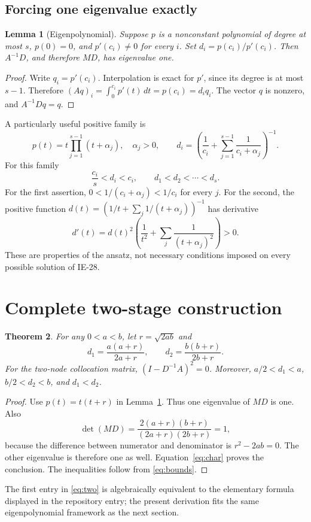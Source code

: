 \documentclass[11pt]{article}
\newtheorem{theorem}{Theorem}[section]
\newtheorem{lemma}[theorem]{Lemma}
\theoremstyle{remark}
\begin{document}
\subsection{Forcing one eigenvalue exactly}
\begin{lemma}[Eigenpolynomial]\label{lem:poly}
Suppose $p$ is a nonconstant polynomial of degree at most $s$, $p(0)=0$, and
$p'(c_i)\ne0$ for every $i$. Set $d_i=p(c_i)/p'(c_i)$. Then $A^{-1}D$, and
therefore $MD$, has eigenvalue one.
\end{lemma}
\begin{proof}
Write $q_i=p'(c_i)$. Interpolation is exact for $p'$, since its degree is at
most $s-1$. Therefore $(Aq)_i=\int_0^{c_i}p'(t)\,dt=p(c_i)=d_iq_i$.
The vector $q$ is nonzero, and $A^{-1}Dq=q$.
\end{proof}
A particularly useful positive family is
\begin{equation}\label{eq:ansatz}
 p(t)=t\prod_{j=1}^{s-1}(t+\alpha_j),\quad \alpha_j>0,\qquad
 d_i=\left(\frac1{c_i}+\sum_{j=1}^{s-1}\frac1{c_i+\alpha_j}\right)^{-1}.
\end{equation}
For this family
\begin{equation}\label{eq:bounds}
 \frac{c_i}{s}<d_i<c_i,\qquad d_1<d_2<\cdots<d_s.
\end{equation}
For the first assertion, $0<1/(c_i+\alpha_j)<1/c_i$ for every $j$. For the second, the positive function
$d(t)=(1/t+\sum_j1/(t+\alpha_j))^{-1}$ has derivative
\[
 d'(t)=d(t)^2\left(\frac1{t^2}+\sum_j\frac1{(t+\alpha_j)^2}\right)>0.
\]
These are properties of the ansatz, not necessary conditions imposed on every
possible solution of IE-28.

\section{Complete two-stage construction}
\begin{theorem}\label{thm:two}
For any $0<a<b$, let $r=\sqrt{2ab}$ and
\begin{equation}\label{eq:two}
 d_1=\frac{a(a+r)}{2a+r},\qquad d_2=\frac{b(b+r)}{2b+r}.
\end{equation}
For the two-node collocation matrix, $(I-D^{-1}A)^2=0$. Moreover,
$a/2<d_1<a$, $b/2<d_2<b$, and $d_1<d_2$.
\end{theorem}
\begin{proof}
Use $p(t)=t(t+r)$ in Lemma~\ref{lem:poly}. Thus one eigenvalue of $MD$ is one.
Also
\[
 \det(MD)=\frac{2(a+r)(b+r)}{(2a+r)(2b+r)}=1,
\]
because the difference between numerator and denominator is $r^2-2ab=0$.
The other eigenvalue is therefore one as well. Equation~\eqref{eq:char} proves
the conclusion. The inequalities follow from \eqref{eq:bounds}.
\end{proof}
The first entry in \eqref{eq:two} is algebraically equivalent to the elementary
formula displayed in the repository entry; the present derivation fits the
same eigenpolynomial framework as the next section.
\end{document}
